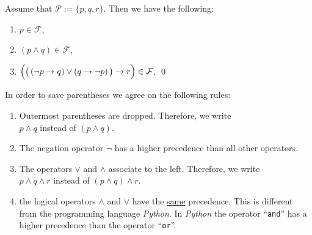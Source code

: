 \exampleEng 
Assume that $\mathcal{P} := \{ p, q, r \}$. Then we have the following:
\begin{enumerate}
\item $p \in \mathcal{F}$,
\item $(p \wedge q) \in \mathcal{F}$,
\item $\Bigl(\bigl(\,(\neg p \rightarrow q) \vee (q \rightarrow \neg p)\,\bigr) \rightarrow r\Bigr) \in \mathcal{F}$.  \qed
\end{enumerate}

\noindent
In order to save parentheses we agree on the following rules:
\begin{enumerate}
\item Outermost parentheses are dropped.  Therefore, we write \\[0.2cm]
      \hspace*{1.3cm} $p \wedge q$ \quad instead of \quad $(p \wedge q)$.
\item The negation operator $\neg$ has a higher precedence than all other operators. 
\item The operators  $\vee$ and $\wedge$ associate to the left.  Therefore, we write 
      \\[0.2cm]
      \hspace*{1.3cm} $p \wedge q \wedge r$ \quad instead of \quad $(p \wedge q) \wedge r$.
\item \underline{\textbf{}} the logical operators 
      $\wedge$ and $\vee$ have the \underline{same} precedence.  This is different from the programming
      language  \textsl{Python}.  In \textsl{Python} the operator ``\texttt{and}'' has a higher precedence than
      the  operator ``\texttt{or}''.
      

\end{enumerate}
